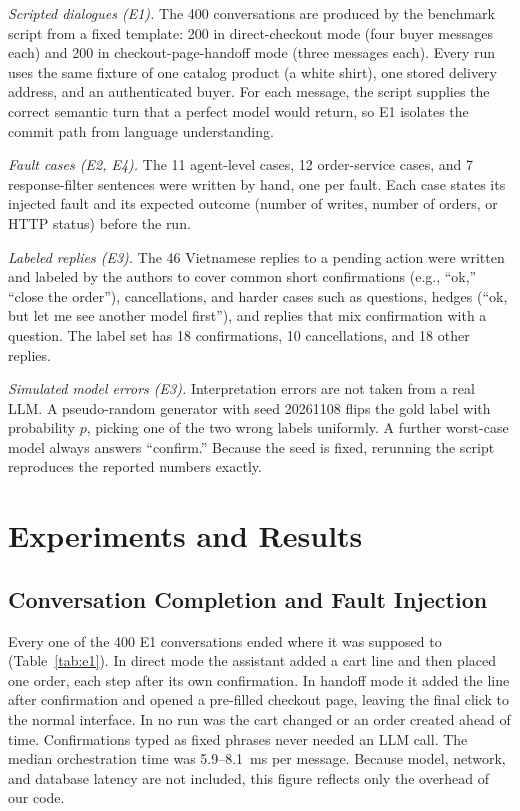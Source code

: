 \documentclass{IEEEtran}
\begin{document}
\textit{Scripted dialogues (E1).} The 400 conversations are produced by the benchmark script from a fixed template: 200 in direct-checkout mode (four buyer messages each) and 200 in checkout-page-handoff mode (three messages each). Every run uses the same fixture of one catalog product (a white shirt), one stored delivery address, and an authenticated buyer. For each message, the script supplies the correct semantic turn that a perfect model would return, so E1 isolates the commit path from language understanding.

\textit{Fault cases (E2, E4).} The 11 agent-level cases, 12 order-service cases, and 7 response-filter sentences were written by hand, one per fault. Each case states its injected fault and its expected outcome (number of writes, number of orders, or HTTP status) before the run.

\textit{Labeled replies (E3).} The 46 Vietnamese replies to a pending action were written and labeled by the authors to cover common short confirmations (e.g., ``ok,'' ``close the order''), cancellations, and harder cases such as questions, hedges (``ok, but let me see another model first''), and replies that mix confirmation with a question. The label set has 18 confirmations, 10 cancellations, and 18 other replies.

\textit{Simulated model errors (E3).} Interpretation errors are not taken from a real LLM. A pseudo-random generator with seed 20261108 flips the gold label with probability $p$, picking one of the two wrong labels uniformly. A further worst-case model always answers ``confirm.'' Because the seed is fixed, rerunning the script reproduces the reported numbers exactly.

\section{Experiments and Results}
\label{sec:results}

\subsection{Conversation Completion and Fault Injection}

Every one of the 400 E1 conversations ended where it was supposed to (Table~\ref{tab:e1}). In direct mode the assistant added a cart line and then placed one order, each step after its own confirmation. In handoff mode it added the line after confirmation and opened a pre-filled checkout page, leaving the final click to the normal interface. In no run was the cart changed or an order created ahead of time. Confirmations typed as fixed phrases never needed an LLM call. The median orchestration time was 5.9--8.1~ms per message. Because model, network, and database latency are not included, this figure reflects only the overhead of our code.
\end{document}
